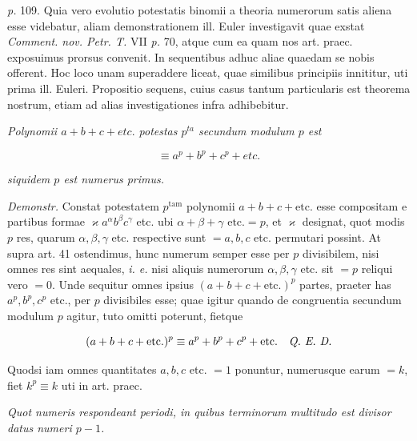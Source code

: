 \emph{p.} 109. Quia vero evolutio potestatis binomii a theoria numerorum satis aliena esse videbatur, aliam demonstrationem ill. Euler investigavit quae exstat \emph{Comment. nov. Petr. T.} VII \emph{p.} 70, atque cum ea quam nos art. praec. exposuimus prorsus convenit. In sequentibus adhuc aliae quaedam se nobis offerent. Hoc loco unam superaddere liceat, quae similibus principiis innititur, uti prima ill. Euleri. Propositio sequens, cuius casus tantum particularis est theorema nostrum, etiam ad alias investigationes infra adhibebitur.


\emph{Polynomii $a+b+c+\mathit{etc.}$ potestas $p^{ta}$ secundum modulum $p$ est}

\[\equiv a^p+b^p+c^p+\mathit{etc.}\]

\noindent\emph{siquidem $p$ est numerus primus.}

\emph{Demonstr.} Constat potestatem $p^{\mathrm{tam}}$ polynomii $a+b+c+\text{etc.}$ esse compositam e partibus formae $\varkappa a^\alpha b^\beta c^\gamma$ etc. ubi $\alpha+\beta+\gamma\text{ etc.}=p$, et $\varkappa$ designat, quot modis $p$ res, quarum $\alpha,\beta,\gamma$ etc. respective sunt $=a,b,c$ etc. permutari possint. At supra art. 41 ostendimus, hunc numerum semper esse per $p$ divisibilem, nisi omnes res sint aequales, \emph{i. e.} nisi aliquis numerorum $\alpha,\beta,\gamma$ etc. sit $=p$ reliqui vero $=0$. Unde sequitur omnes ipsius $(a+b+c+\text{etc.})^p$ partes, praeter has $a^p,b^p,c^p$ etc., per $p$ divisibiles esse; quae igitur quando de congruentia secundum modulum $p$ agitur, tuto omitti poterunt, fietque

\[(a+b+c+\mathrm{etc.})^p\equiv a^p+b^p+c^p+\mathrm{etc.}\quad\text{\emph{Q. E. D.}}\]

Quodsi iam omnes quantitates $a,b,c$ etc. $=1$ ponuntur, numerusque earum $=k$, fiet $k^p\equiv k$ uti in art. praec.

\begin{center}\emph{Quot numeris respondeant periodi, in quibus terminorum multitudo est divisor datus numeri $p-1$.}\end{center}


